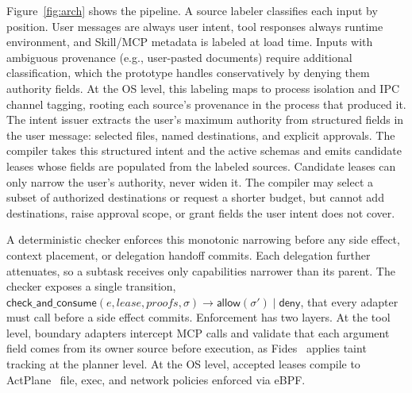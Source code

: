 \documentclass[sigconf,nonacm]{acmart}
\begin{document}
Figure~\ref{fig:arch} shows the pipeline.
A source labeler classifies each input by position.
User messages are always user intent, tool responses always runtime environment, and Skill/MCP metadata is labeled at load time.
Inputs with ambiguous provenance (e.g., user-pasted documents) require additional classification, which the prototype handles conservatively by denying them authority fields.
At the OS level, this labeling maps to process isolation and IPC channel tagging, rooting each source's provenance in the process that produced it.
The intent issuer extracts the user's maximum authority from structured fields in the user message: selected files, named destinations, and explicit approvals.
The compiler takes this structured intent and the active schemas and emits candidate leases whose fields are populated from the labeled sources.
Candidate leases can only narrow the user's authority, never widen it.
The compiler may select a subset of authorized destinations or request a shorter budget, but cannot add destinations, raise approval scope, or grant fields the user intent does not cover.


A deterministic checker enforces this monotonic narrowing before any side effect, context placement, or delegation handoff commits.
Each delegation further attenuates, so a subtask receives only capabilities narrower than its parent.
The checker exposes a single transition, $\mathsf{check\_and\_consume}(e,\allowbreak\mathit{lease},\allowbreak\mathit{proofs},\allowbreak\sigma) \rightarrow \mathsf{allow}(\sigma') \mid \mathsf{deny}$, that every adapter must call before a side effect commits.
Enforcement has two layers. At the tool level, boundary adapters intercept MCP calls and validate that each argument field comes from its owner source before execution, as Fides~\cite{fides} applies taint tracking at the planner level. At the OS level, accepted leases compile to ActPlane~\cite{actplane} file, exec, and network policies enforced via eBPF.
\end{document}

